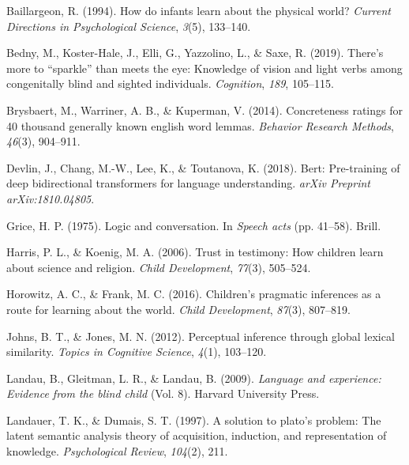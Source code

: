 \documentclass[10pt, letterpaper]{article}
\begin{document}
\setlength{\parindent}{-0.1in} 
\setlength{\leftskip}{0.125in}

\noindent

\hypertarget{refs}{}
\leavevmode\hypertarget{ref-baillargeon1994}{}%
Baillargeon, R. (1994). How do infants learn about the physical world?
\emph{Current Directions in Psychological Science}, \emph{3}(5),
133--140.

\leavevmode\hypertarget{ref-bedny2019}{}%
Bedny, M., Koster-Hale, J., Elli, G., Yazzolino, L., \& Saxe, R. (2019).
There's more to ``sparkle'' than meets the eye: Knowledge of vision and
light verbs among congenitally blind and sighted individuals.
\emph{Cognition}, \emph{189}, 105--115.

\leavevmode\hypertarget{ref-brysbaert2014}{}%
Brysbaert, M., Warriner, A. B., \& Kuperman, V. (2014). Concreteness
ratings for 40 thousand generally known english word lemmas.
\emph{Behavior Research Methods}, \emph{46}(3), 904--911.

\leavevmode\hypertarget{ref-devlin2018}{}%
Devlin, J., Chang, M.-W., Lee, K., \& Toutanova, K. (2018). Bert:
Pre-training of deep bidirectional transformers for language
understanding. \emph{arXiv Preprint arXiv:1810.04805}.

\leavevmode\hypertarget{ref-grice1975}{}%
Grice, H. P. (1975). Logic and conversation. In \emph{Speech acts} (pp.
41--58). Brill.

\leavevmode\hypertarget{ref-harris2006}{}%
Harris, P. L., \& Koenig, M. A. (2006). Trust in testimony: How children
learn about science and religion. \emph{Child Development},
\emph{77}(3), 505--524.

\leavevmode\hypertarget{ref-horowitz2016}{}%
Horowitz, A. C., \& Frank, M. C. (2016). Children's pragmatic inferences
as a route for learning about the world. \emph{Child Development},
\emph{87}(3), 807--819.

\leavevmode\hypertarget{ref-johns2012}{}%
Johns, B. T., \& Jones, M. N. (2012). Perceptual inference through
global lexical similarity. \emph{Topics in Cognitive Science},
\emph{4}(1), 103--120.

\leavevmode\hypertarget{ref-landau2009}{}%
Landau, B., Gleitman, L. R., \& Landau, B. (2009). \emph{Language and
experience: Evidence from the blind child} (Vol. 8). Harvard University
Press.

\leavevmode\hypertarget{ref-landauer1997}{}%
Landauer, T. K., \& Dumais, S. T. (1997). A solution to plato's problem:
The latent semantic analysis theory of acquisition, induction, and
representation of knowledge. \emph{Psychological Review}, \emph{104}(2),
211.
\end{document}
